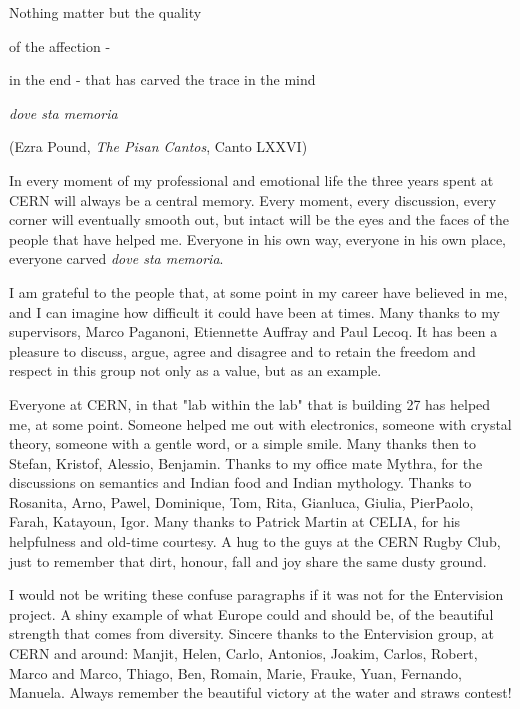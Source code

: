 \acknowledgements

\begin{center}
Nothing matter but the quality 

of the affection -

in the end - that has carved the trace in the mind 

\textit{dove sta memoria}

(Ezra Pound, \textit{The Pisan Cantos}, Canto LXXVI)
\end{center}

In every moment of my professional and emotional life the three years spent at CERN will always be a central memory. Every moment, every discussion, every corner will eventually smooth out, but intact will be the eyes and the faces of the people that have helped me. Everyone in his own way, everyone in his own place, everyone carved \textit{dove sta memoria}.

I am grateful to the people that, at some point in my career have believed in me, and I can imagine how difficult it could have been at times. Many thanks to my supervisors, Marco Paganoni, Etiennette Auffray and Paul Lecoq. It has been a pleasure to discuss, argue, agree and disagree and to retain the freedom and respect in this group not only as a value, but as an example.

Everyone at CERN, in that "lab within the lab" that is building 27 has helped me, at some point. Someone helped me out with electronics, someone with crystal theory, someone with a gentle word, or a simple smile. Many thanks then to Stefan, Kristof, Alessio, Benjamin. Thanks to my office mate Mythra, for the discussions on semantics and Indian food and Indian mythology. Thanks to Rosanita, Arno, Pawel, Dominique, Tom, Rita, Gianluca, Giulia, PierPaolo, Farah, Katayoun, Igor. 
Many thanks to Patrick Martin at CELIA, for his helpfulness and old-time courtesy. 
A hug to the guys at the CERN Rugby Club, just to remember that dirt, honour, fall and joy share the same dusty ground.

I would not be writing these confuse paragraphs if it was not for the Entervision project. A shiny example of what Europe could and should be, of the beautiful strength that comes from diversity. Sincere thanks to the Entervision group, at CERN and around: Manjit, Helen, Carlo, Antonios, Joakim, Carlos, Robert, Marco and Marco, Thiago, Ben, Romain, Marie, Frauke, Yuan, Fernando, Manuela. Always remember the beautiful victory at the water and straws contest!

